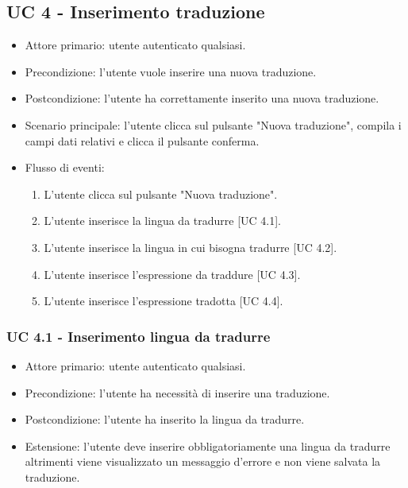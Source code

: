     



\subsection{UC 4 - Inserimento traduzione}
    \begin{itemize}
    \item Attore primario: utente autenticato qualsiasi.
    \item Precondizione: l'utente vuole inserire una nuova traduzione.
    \item Postcondizione: l'utente ha correttamente inserito una nuova traduzione.
    \item Scenario principale: l'utente clicca sul pulsante "Nuova traduzione", compila i campi dati relativi e clicca il pulsante conferma.
    \item Flusso di eventi:
        \begin{enumerate}
            \item L'utente clicca sul pulsante "Nuova traduzione".
            \item L'utente inserisce la lingua da tradurre [UC 4.1].
            \item L'utente inserisce la lingua in cui bisogna tradurre [UC 4.2].
            \item L'utente inserisce l'espressione da traddure [UC 4.3].
            \item L'utente inserisce l'espressione tradotta [UC 4.4].
        \end{enumerate}
    \end{itemize}
    \subsubsection{UC 4.1 - Inserimento lingua da tradurre}
        \begin{itemize}
            \item Attore primario: utente autenticato qualsiasi.
            \item Precondizione: l'utente ha necessità di inserire una traduzione.
            \item Postcondizione: l'utente ha inserito la lingua da tradurre.
            \item Estensione: l'utente deve inserire obbligatoriamente una lingua da tradurre altrimenti viene visualizzato un messaggio d'errore e non viene salvata la traduzione.
        \end{itemize}
